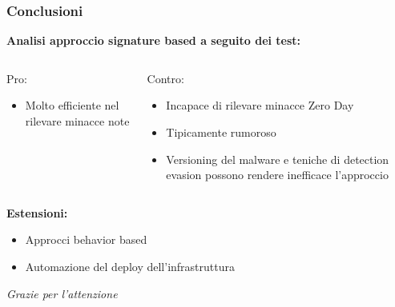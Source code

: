 \begin{frame}
    \frametitle{Conclusioni}
    \centering
    \textbf{Analisi approccio signature based a seguito dei test:}
    \smallskip
    \begin{columns}[t]
        \begin{column}{0.5\textwidth}
            \centering
            Pro:
            \begin{itemize}
                \item Molto efficiente nel rilevare minacce note
            \end{itemize}
        \end{column}
        \begin{column}{0.5\textwidth}
            \centering
            Contro:
            \begin{itemize}
                \item Incapace di rilevare minacce Zero Day
                \item Tipicamente rumoroso
                \item Versioning del malware e teniche di detection evasion possono rendere inefficace l'approccio
            \end{itemize}
        \end{column}
    \end{columns}

    \bigskip

    \textbf{Estensioni:}
    \begin{itemize}
        \item Approcci behavior based
        \item Automazione del deploy dell'infrastruttura
    \end{itemize}
\end{frame}

\begin{frame}
    \centering
    \Huge
    \emph{Grazie per l'attenzione}
\end{frame}